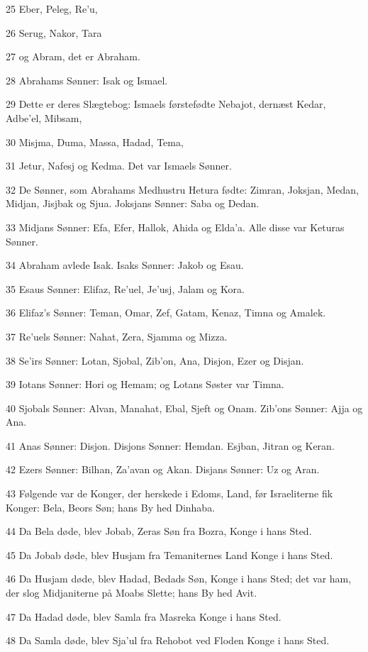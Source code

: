 \par 25 Eber, Peleg, Re'u,
\par 26 Serug, Nakor, Tara
\par 27 og Abram, det er Abraham.
\par 28 Abrahams Sønner: Isak og Ismael.
\par 29 Dette er deres Slægtebog: Ismaels førstefødte Nebajot, dernæst Kedar, Adbe'el, Mibsam,
\par 30 Misjma, Duma, Massa, Hadad, Tema,
\par 31 Jetur, Nafesj og Kedma. Det var Ismaels Sønner.
\par 32 De Sønner, som Abrahams Medhustru Hetura fødte: Zimran, Joksjan, Medan, Midjan, Jisjbak og Sjua. Joksjans Sønner: Saba og Dedan.
\par 33 Midjans Sønner: Efa, Efer, Hallok, Ahida og Elda'a. Alle disse var Keturas Sønner.
\par 34 Abraham avlede Isak. Isaks Sønner: Jakob og Esau.
\par 35 Esaus Sønner: Elifaz, Re'uel, Je'usj, Jalam og Kora.
\par 36 Elifaz's Sønner: Teman, Omar, Zef, Gatam, Kenaz, Timna og Amalek.
\par 37 Re'uels Sønner: Nahat, Zera, Sjamma og Mizza.
\par 38 Se'irs Sønner: Lotan, Sjobal, Zib'on, Ana, Disjon, Ezer og Disjan.
\par 39 Iotans Sønner: Hori og Hemam; og Lotans Søster var Timna.
\par 40 Sjobals Sønner: Alvan, Manahat, Ebal, Sjeft og Onam. Zib'ons Sønner: Ajja og Ana.
\par 41 Anas Sønner: Disjon. Disjons Sønner: Hemdan. Esjban, Jitran og Keran.
\par 42 Ezers Sønner: Bilhan, Za'avan og Akan. Disjans Sønner: Uz og Aran.
\par 43 Følgende var de Konger, der herskede i Edoms, Land, før Israeliterne fik Konger: Bela, Beors Søn; hans By hed Dinhaba.
\par 44 Da Bela døde, blev Jobab, Zeras Søn fra Bozra, Konge i hans Sted.
\par 45 Da Jobab døde, blev Husjam fra Temaniternes Land Konge i hans Sted.
\par 46 Da Husjam døde, blev Hadad, Bedads Søn, Konge i hans Sted; det var ham, der slog Midjaniterne på Moabs Slette; hans By hed Avit.
\par 47 Da Hadad døde, blev Samla fra Masreka Konge i hans Sted.
\par 48 Da Samla døde, blev Sja'ul fra Rehobot ved Floden Konge i hans Sted.

